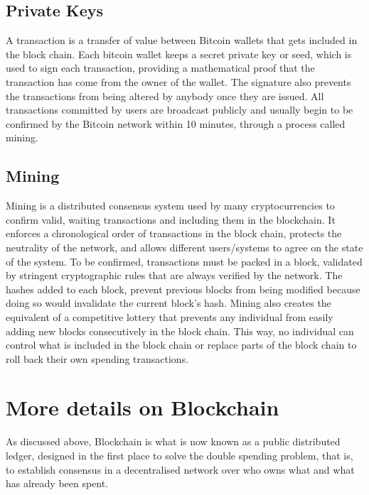 \subsection{Private Keys}
A transaction is a transfer of value between Bitcoin wallets that gets included in the block chain. Each bitcoin wallet keeps a secret  private key or seed, which is used to sign each transaction, providing a mathematical proof that the transaction has come from the owner of the wallet. The signature also prevents the transactions from being altered by anybody once they are issued. All transactions committed by users are broadcast publicly and usually begin to be confirmed by the Bitcoin network within 10 minutes, through a process called mining.

\subsection{Mining}
Mining is a distributed consensus system used by many cryptocurrencies to confirm valid, waiting transactions and including them in the blockchain. It enforces a chronological order of transactions in the block chain, protects the neutrality of the network, and allows different users/systems to agree on the state of the system. To be confirmed, transactions must be packed in a block, validated by stringent cryptographic rules that are always verified by the network. The hashes added to each block, prevent previous blocks from being modified because doing so would invalidate the current block's hash. Mining also creates the equivalent of a competitive lottery that prevents any individual from easily adding new blocks consecutively in the block chain. This way, no individual can control what is included in the block chain or replace parts of the block chain to roll back their own spending transactions.

\section{More details on Blockchain}
As discussed above, Blockchain is what is now known as a public distributed ledger, designed in the first place to solve the double spending problem, that is, to establish consensus in a decentralised network over who owns what and what has already been spent\cite{Nakamoto2008Bitcoin:System}. 


